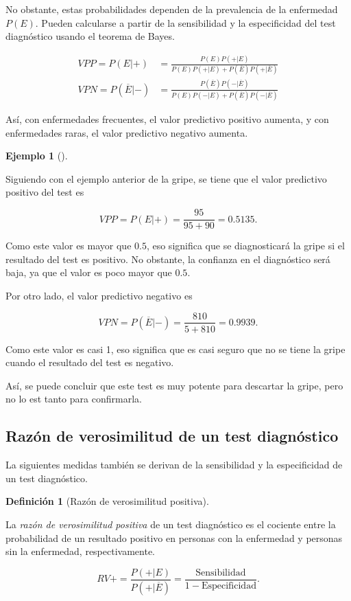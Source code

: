 \documentclass[
  a4paper,
]{scrreport}
\theoremstyle{plain}
\theoremstyle{definition}
\newtheorem{definition}{Definición}[chapter]
\theoremstyle{definition}
\newtheorem{example}{Ejemplo}[chapter]
\theoremstyle{remark}
\begin{document}
No obstante, estas probabilidades dependen de la prevalencia de la
enfermedad \(P(E)\). Pueden calcularse a partir de la sensibilidad y la
especificidad del test diagnóstico usando el teorema de Bayes.

\begin{align*}
VPP=P(E|+) &= \frac{P(E)P(+|E)}{P(E)P(+|E)+P(\overline{E})P(+|\overline{E})}\\
VPN=P(\overline{E}|-) &= \frac{P(\overline{E})P(-|\overline{E})}{P(E)P(-|E)+P(\overline{E})P(-|\overline{E})}
\end{align*}

Así, con enfermedades frecuentes, el valor predictivo positivo aumenta,
y con enfermedades raras, el valor predictivo negativo aumenta.

\begin{example}[]\protect\hypertarget{exm-valores-predictivos}{}\label{exm-valores-predictivos}

Siguiendo con el ejemplo anterior de la gripe, se tiene que el valor
predictivo positivo del test es

\[VPP = P(E|+) = \frac{95}{95+90} = 0.5135.\]

Como este valor es mayor que \(0.5\), eso significa que se diagnosticará
la gripe si el resultado del test es positivo. No obstante, la confianza
en el diagnóstico será baja, ya que el valor es poco mayor que \(0.5\).

Por otro lado, el valor predictivo negativo es

\[VPN = P(\overline{E}|-) = \frac{810}{5+810} = 0.9939.\]

Como este valor es casi 1, eso significa que es casi seguro que no se
tiene la gripe cuando el resultado del test es negativo.

Así, se puede concluir que este test es muy potente para descartar la
gripe, pero no lo est tanto para confirmarla.

\end{example}

\subsection{Razón de verosimilitud de un test
diagnóstico}\label{razuxf3n-de-verosimilitud-de-un-test-diagnuxf3stico}

La siguientes medidas también se derivan de la sensibilidad y la
especificidad de un test diagnóstico.

\begin{definition}[Razón de verosimilitud
positiva]\protect\hypertarget{def-razon-verosimilitud-positiva}{}\label{def-razon-verosimilitud-positiva}

La \emph{razón de verosimilitud positiva} de un test diagnóstico es el
cociente entre la probabilidad de un resultado positivo en personas con
la enfermedad y personas sin la enfermedad, respectivamente.

\[RV+=\frac{P(+|E)}{P(+|\overline{E})} = \frac{\mbox{Sensibilidad}}{1-\mbox{Especificidad}}.\]

\end{definition}
\end{document}
